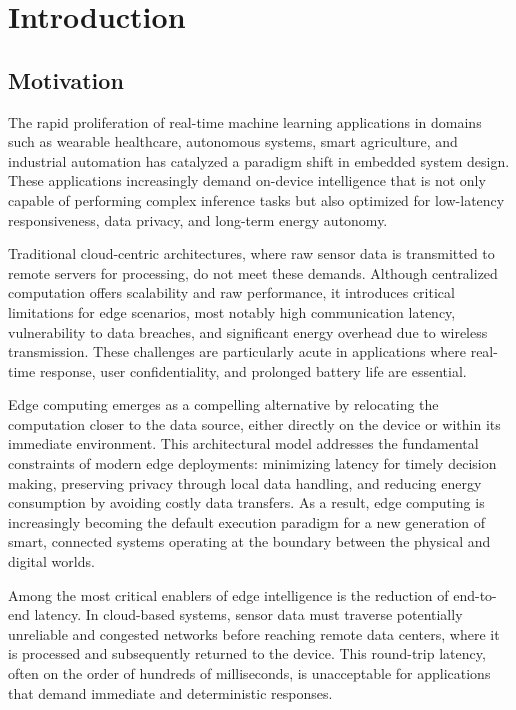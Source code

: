 \chapter{Introduction}
\pagestyle{fancy}

    \section{Motivation}

        The rapid proliferation of real-time machine learning applications in domains such as wearable healthcare, autonomous systems, smart agriculture, and industrial automation has catalyzed a paradigm shift in embedded system design. These applications increasingly demand on-device intelligence that is not only capable of performing complex inference tasks but also optimized for low-latency responsiveness, data privacy, and long-term energy autonomy.

        Traditional cloud-centric architectures, where raw sensor data is transmitted to remote servers for processing, do not meet these demands. Although centralized computation offers scalability and raw performance, it introduces critical limitations for edge scenarios, most notably high communication latency, vulnerability to data breaches, and significant energy overhead due to wireless transmission. These challenges are particularly acute in applications where real-time response, user confidentiality, and prolonged battery life are essential.

        Edge computing emerges as a compelling alternative by relocating the computation closer to the data source, either directly on the device or within its immediate environment. This architectural model addresses the fundamental constraints of modern edge deployments: minimizing latency for timely decision making, preserving privacy through local data handling, and reducing energy consumption by avoiding costly data transfers. As a result, edge computing is increasingly becoming the default execution paradigm for a new generation of smart, connected systems operating at the boundary between the physical and digital worlds.

        Among the most critical enablers of edge intelligence is the reduction of end-to-end latency. In cloud-based systems, sensor data must traverse potentially unreliable and congested networks before reaching remote data centers, where it is processed and subsequently returned to the device. This round-trip latency, often on the order of hundreds of milliseconds, is unacceptable for applications that demand immediate and deterministic responses.
        

